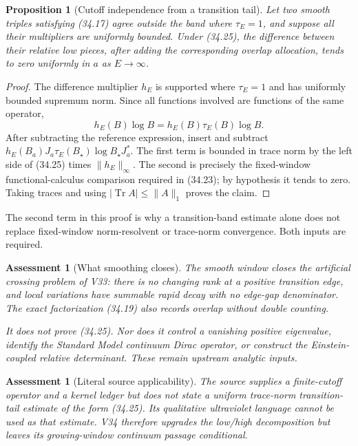 \documentclass[11pt]{article}
\newtheorem{proposition}[theorem]{Proposition}
\newtheorem{assessment}[theorem]{Assessment}
\theoremstyle{remark}
\begin{document}
\begin{proposition}[Cutoff independence from a transition tail]
\label{prop:v15v34-cutoff-independence}
Let two smooth triples satisfying (34.17) agree outside the band
where \(\tau_E=1\), and suppose all their multipliers are uniformly
bounded.  Under (34.25), the difference between their relative low
pieces, after adding the corresponding overlap allocation, tends to
zero uniformly in \(a\) as \(E\to\infty\).
\end{proposition}

\begin{proof}
The difference multiplier \(h_E\) is supported where
\(\tau_E=1\) and has uniformly bounded supremum norm.  Since all
functions involved are functions of the same operator,
\[
 h_E(B)\log B=h_E(B)\tau_E(B)\log B.                       \tag{34.26}
\]
After subtracting the reference expression, insert and subtract
\(h_E(B_a)J_a\tau_E(B_\star)\log B_\star J_a^*\).  The first
term is bounded in trace norm by the left side of (34.25) times
\(\|h_E\|_\infty\).  The second is precisely the fixed-window
functional-calculus comparison required in (34.23); by hypothesis
it tends to zero.  Taking traces and using
\(|\operatorname{Tr}A|\leq\|A\|_1\) proves the claim.
\end{proof}

The second term in this proof is why a transition-band estimate
alone does not replace fixed-window norm-resolvent or trace-norm
convergence.  Both inputs are required.

\begin{assessment}[What smoothing closes]
\label{ass:v15v34-closes}
The smooth window closes the artificial crossing problem of V33:
there is no changing rank at a positive transition edge, and local
variations have summable rapid decay with no edge-gap denominator.
The exact factorization (34.19) also records overlap without double
counting.

It does not prove (34.25).  Nor does it control a vanishing positive
eigenvalue, identify the Standard Model continuum Dirac operator, or
construct the Einstein-coupled relative determinant.  These remain
upstream analytic inputs.
\end{assessment}

\begin{assessment}[Literal source applicability]
\label{ass:v15v34-source}
The source supplies a finite-cutoff operator and a kernel ledger but
does not state a uniform trace-norm transition-tail estimate of the
form (34.25).  Its qualitative ultraviolet language cannot be used
as that estimate.  V34 therefore upgrades the low/high
decomposition but leaves its growing-window continuum passage
conditional.
\end{assessment}
\end{document}

